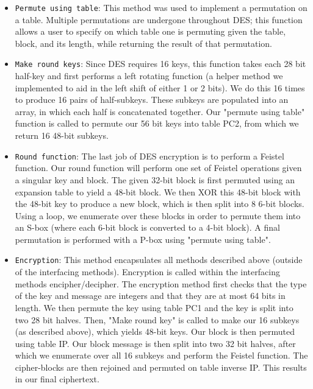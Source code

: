 \documentclass[acmlarge]{acmart}
\begin{document}
\begin{itemize}
	\item \texttt{Permute using table}: This method was used to implement a permutation on a table. Multiple permutations are undergone throughout DES; this function allows a user to specify on which table one is permuting given the table, block, and its length, while returning the result of that permutation.
	\item \texttt{Make round keys}: Since DES requires 16 keys, this function takes each 28 bit half-key and first performs a left rotating function (a helper method we implemented to aid in the left shift of either 1 or 2 bits). We do this 16 times to produce 16 pairs of half-subkeys. These subkeys are populated into an array, in which each half is concatenated together. Our "permute using table" function is called to permute our 56 bit keys into table PC2, from which we return 16 48-bit subkeys.
	\item \texttt{Round function}: The last job of DES encryption is to perform a Feistel function. Our round function will perform one set of Feistel operations given a singular key and block. The given 32-bit block is first permuted using an expansion table to yield a 48-bit block. We then XOR this 48-bit block with the 48-bit key to produce a new block, which is then split into 8 6-bit blocks. Using a loop, we enumerate over these blocks in order to permute them into an S-box (where each 6-bit block is converted to a 4-bit block). A final permutation is performed with a P-box using "permute using table". 
	\item \texttt{Encryption}: This method encapsulates all methods described above (outside of the interfacing methods). Encryption is called within the interfacing methods encipher/decipher. The encryption method first checks that the type of the key and message are integers and that they are at most 64 bits in length. We then permute the key using table PC1 and the key is split into two 28 bit halves. Then, "Make round key" is called to make our 16 subkeys (as described above), which yields 48-bit keys. Our block is then permuted using table IP. Our block message is then split into two 32 bit halves, after which we enumerate over all 16 subkeys and perform the Feistel function. The cipher-blocks are then rejoined and permuted on table inverse IP. This results in our final ciphertext. 
\end{itemize}
\end{document}
